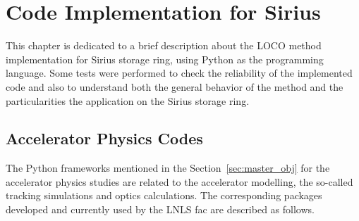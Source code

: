 \chapter{Code Implementation for Sirius}\label{chap:code_studies}
This chapter is dedicated to a brief description about the LOCO method implementation for Sirius storage ring, using Python as the programming language. Some tests were performed to check the reliability of the implemented code and also to understand both the general behavior of the method and the particularities the application on the Sirius storage ring.
\section{Accelerator Physics Codes}
The Python frameworks mentioned in the Section~\ref{sec:master_obj} for the accelerator physics studies are related to the accelerator modelling, the so-called tracking simulations and optics calculations. The corresponding packages developed and currently used by the LNLS \gls{fac} are described as follows.

